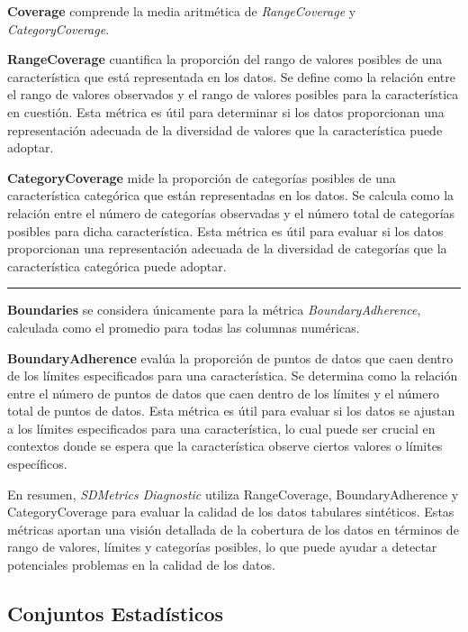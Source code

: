 \textbf{Coverage} comprende la media aritmética de \emph{RangeCoverage} y \emph{CategoryCoverage}.

\textbf{RangeCoverage} cuantifica la proporción del rango de valores posibles de una característica que está representada en los datos. Se define como la relación entre el rango de valores observados y el rango de valores posibles para la característica en cuestión. Esta métrica es útil para determinar si los datos proporcionan una representación adecuada de la diversidad de valores que la característica puede adoptar.

\textbf{CategoryCoverage} mide la proporción de categorías posibles de una característica categórica que están representadas en los datos. Se calcula como la relación entre el número de categorías observadas y el número total de categorías posibles para dicha característica. Esta métrica es útil para evaluar si los datos proporcionan una representación adecuada de la diversidad de categorías que la característica categórica puede adoptar.

\rule{\textwidth}{0.5pt} 

\textbf{Boundaries} se considera únicamente para la métrica \emph{BoundaryAdherence}, calculada como el promedio para todas las columnas numéricas.

\textbf{BoundaryAdherence} evalúa la proporción de puntos de datos que caen dentro de los límites especificados para una característica. Se determina como la relación entre el número de puntos de datos que caen dentro de los límites y el número total de puntos de datos. Esta métrica es útil para evaluar si los datos se ajustan a los límites especificados para una característica, lo cual puede ser crucial en contextos donde se espera que la característica observe ciertos valores o límites específicos.

En resumen, \emph{SDMetrics Diagnostic} utiliza RangeCoverage, BoundaryAdherence y CategoryCoverage para evaluar la calidad de los datos tabulares sintéticos. Estas métricas aportan una visión detallada de la cobertura de los datos en términos de rango de valores, límites y categorías posibles, lo que puede ayudar a detectar potenciales problemas en la calidad de los datos.
\newpage

\subsection{Conjuntos Estadísticos}

